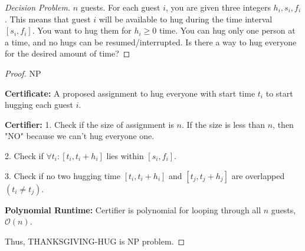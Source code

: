 \documentclass[openany]{article}
\begin{document}
\begin{proof}[Decision Problem]
    \renewcommand{\qedsymbol}{}
    $n$ guests. For each guest $i$, you are given three integers $h_i, s_i, f_i$. This means that guest $i$ will be available to hug during the time interval $[s_i, f_i]$. You want to hug them for $h_i \geqslant 0$ time. You can hug only one person at a time, and no hugs can be resumed/interrupted.
    Is there a way to hug everyone for the desired amount of time?
\end{proof}

\begin{proof}{NP}

\textbf{Certificate:} A proposed assignment to hug everyone with start time $t_i$ to start hugging each guest $i$.

\textbf{Certifier:} 1. Check if the size of assignment is $n$. If the size is less than $n$, then "NO" because we can't hug everyone one.

2. Check if $\forall t_i: [t_i, t_i+h_i]$ lies within $[s_i, f_i]$.

3. Check if no two hugging time $[t_i, t_i+h_i]$ and $[t_j, t_j+h_j]$ are overlapped $(t_i \neq t_j)$.

\textbf{Polynomial Runtime:} Certifier is polynomial for looping through all $n$ guests, $\mathcal{O}(n)$. 

Thus, THANKSGIVING-HUG is NP problem.

\end{proof}
\end{document}
